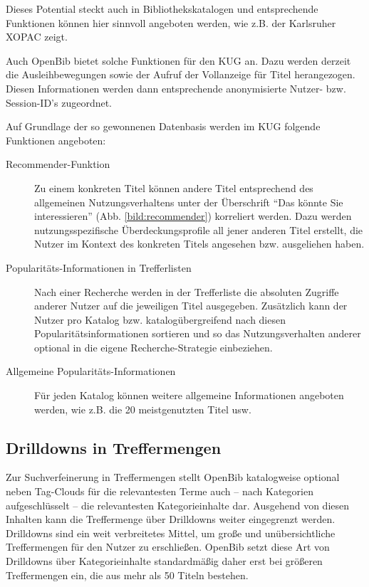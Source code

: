 \documentclass[11pt]{scrartcl}
\begin{document}
Dieses Potential steckt auch in Bibliothekskatalogen und entsprechende
Funktionen können hier sinnvoll angeboten werden, wie z.B. der
Karlsruher XOPAC zeigt.

Auch OpenBib bietet solche Funktionen für den KUG an. Dazu werden
derzeit die Ausleihbewegungen sowie der Aufruf der Vollanzeige für
Titel herangezogen. Diesen Informationen werden dann entsprechende
anonymisierte Nutzer- bzw. Session-ID's zugeordnet.

Auf Grundlage der so gewonnenen Datenbasis werden im KUG folgende
Funktionen angeboten:
\begin{description}
\item[Recommender-Funktion] Zu einem konkreten Titel können andere
  Titel entsprechend des allgemeinen Nutzungsverhaltens unter der
  Überschrift "`Das könnte Sie interessieren"' (Abb.
  \ref{bild:recommender}) korreliert werden. Dazu werden
  nutzungsspezifische Überdeckungsprofile all jener anderen Titel
  erstellt, die Nutzer im Kontext des konkreten Titels angesehen bzw.
  ausgeliehen haben.
\item[Popularitäts-Informationen in Trefferlisten] Nach einer
  Recherche werden in der Trefferliste die absoluten Zugriffe anderer
  Nutzer auf die jeweiligen Titel ausgegeben. Zusätzlich kann der
  Nutzer pro Katalog bzw. katalogübergreifend nach diesen
  Popularitätsinformationen sortieren und so das Nutzungsverhalten
  anderer optional in die eigene Recherche-Strategie einbeziehen.
\item[Allgemeine Popularitäts-Informationen] Für jeden Katalog können
  weitere allgemeine Informationen angeboten werden, wie z.B. die 20
  meistgenutzten Titel usw.
\end{description}


\subsection{Drilldowns in Treffermengen}
Zur Suchverfeinerung in Treffermengen stellt OpenBib katalogweise
optional neben Tag-Clouds für die relevantesten Terme auch -- nach
Kategorien aufgeschlüsselt -- die relevantesten Kategorieinhalte dar.
Ausgehend von diesen Inhalten kann die Treffermenge über Drilldowns
weiter eingegrenzt werden. Drilldowns sind ein weit verbreitetes
Mittel, um große und unübersichtliche Treffermengen für den Nutzer zu
erschließen. OpenBib setzt diese Art von Drilldowns über
Kategorieinhalte standardmäßig daher erst bei größeren Treffermengen
ein, die aus mehr als 50 Titeln bestehen.
\end{document}
